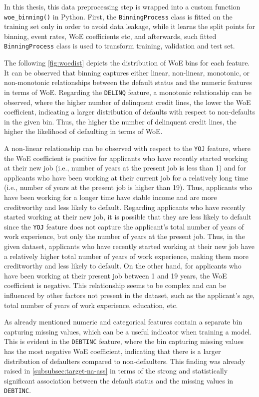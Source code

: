 In this thesis, this data preprocessing step is wrapped into a custom function \lstinline{woe_binning()} in Python.
First, the  \lstinline{BinningProcess} class is fitted on the training set only in order to avoid data leakage, while it learns the split points for binning, event rates, WoE coefficients etc, and afterwards, such fitted  \lstinline{BinningProcess} class is used to transform training, validation and test set.


The following \autoref{fig:woedist} depicts the distribution of WoE bins for each feature. It can be observed that binning captures either linear, non-linear, monotonic, or non-monotonic relationships between the default status and the numeric features in terms of WoE.
Regarding the \texttt{DELINQ} feature, a monotonic relationship can be observed, where the higher number of delinquent credit lines, the lower the WoE coefficient, indicating a larger distribution of defaults with respect to non-defaults in the given bin.
Thus, the higher the number of delinquent credit lines, the higher the likelihood of defaulting in terms of WoE.

A non-linear relationship can be observed with respect to the \texttt{YOJ} feature, where the WoE coefficient is positive for applicants who have recently started working at their new job (i.e., number of years at the present job is less than 1) and for applicants who have been working at their current job for a relatively long time (i.e., number of years at the present job is higher than 19).
Thus, applicants who have been working for a longer time have stable income and are more creditworthy and less likely to default.
Regarding applicants who have recently started working at their new job, it is possible that they are less likely to default since the \texttt{YOJ} feature does not capture the applicant's total number of years of work experience, but only the number of years at the present job.
Thus, in the given dataset, applicants who have recently started working at their new job have a relatively higher total number of years of work experience, making them more creditworthy and less likely to default. On the other hand, for applicants who have been working at their present job between 1 and 19 years, the WoE coefficient is negative.
This relationship seems to be complex and can be influenced by other factors not present in the dataset, such as the applicant's age, total number of years of work experience, education, etc.

As already mentioned numeric and categorical features contain a separate bin capturing missing values, which can be a useful indicator when training a model. This is evident in the \texttt{DEBTINC} feature, where the bin capturing missing values has the most negative WoE coefficient, indicating that there is a larger distribution of defaulters compared to non-defaulters.
This finding was already raised in \autoref{subsubsec:target-na-ass} in terms of the strong and statistically significant association between the default status and the missing values in \texttt{DEBTINC}.

